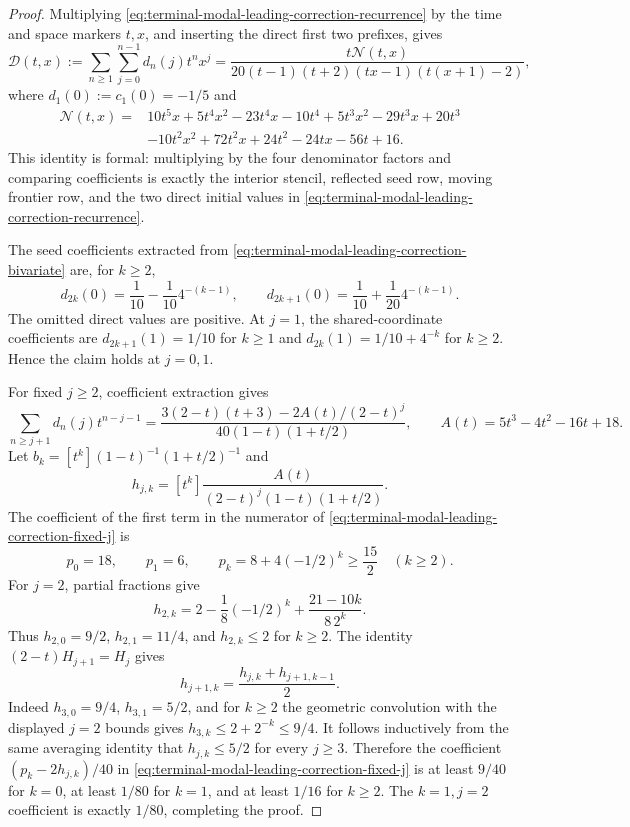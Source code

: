\begin{proof}
Multiplying \eqref{eq:terminal-modal-leading-correction-recurrence} by the
time and space markers $t,x$, and inserting the direct first two prefixes,
gives
\begin{equation}
 \mathcal D(t,x):=\sum_{n\ge1}\sum_{j=0}^{n-1}d_n(j)t^nx^j
 =\frac{t\mathcal N(t,x)}
 {20(t-1)(t+2)(tx-1)(t(x+1)-2)},
 \label{eq:terminal-modal-leading-correction-bivariate}
\end{equation}
where $d_1(0):=c_1(0)=-1/5$ and
\begin{align*}
 \mathcal N(t,x)={}&10t^5x+5t^4x^2-23t^4x-10t^4
 +5t^3x^2-29t^3x+20t^3\\
 &-10t^2x^2+72t^2x+24t^2-24tx-56t+16.
\end{align*}
This identity is formal: multiplying by the four denominator factors and
comparing coefficients is exactly the interior stencil, reflected seed row,
moving frontier row, and the two direct initial values in
\eqref{eq:terminal-modal-leading-correction-recurrence}.

The seed coefficients extracted from
\eqref{eq:terminal-modal-leading-correction-bivariate} are, for $k\ge2$,
\[
 d_{2k}(0)=\frac1{10}-\frac1{10}4^{-(k-1)},\qquad
 d_{2k+1}(0)=\frac1{10}+\frac1{20}4^{-(k-1)}.
\]
The omitted direct values are positive.  At $j=1$, the shared-coordinate
coefficients are $d_{2k+1}(1)=1/10$ for $k\ge1$ and
$d_{2k}(1)=1/10+4^{-k}$ for $k\ge2$.  Hence the claim holds at $j=0,1$.

For fixed $j\ge2$, coefficient extraction gives
\begin{equation}
 \sum_{n\ge j+1}d_n(j)t^{n-j-1}
 =\frac{3(2-t)(t+3)-2A(t)/(2-t)^j}
 {40(1-t)(1+t/2)},
 \qquad
 A(t)=5t^3-4t^2-16t+18.
 \label{eq:terminal-modal-leading-correction-fixed-j}
\end{equation}
Let $b_k=[t^k]{(1-t)^{-1}(1+t/2)^{-1}}$ and
\[
 h_{j,k}=[t^k]\frac{A(t)}{(2-t)^j(1-t)(1+t/2)}.
\]
The coefficient of the first term in the numerator of
\eqref{eq:terminal-modal-leading-correction-fixed-j} is
\[
 p_0=18,\qquad p_1=6,\qquad
 p_k=8+4(-1/2)^k\ge\frac{15}{2}\quad(k\ge2).
\]
For $j=2$, partial fractions give
\[
 h_{2,k}=2-\frac18(-1/2)^k+\frac{21-10k}{8\,2^k}.
\]
Thus $h_{2,0}=9/2$, $h_{2,1}=11/4$, and $h_{2,k}\le2$ for $k\ge2$.
The identity $(2-t)H_{j+1}=H_j$ gives
\[
 h_{j+1,k}=\frac{h_{j,k}+h_{j+1,k-1}}2.
\]
Indeed $h_{3,0}=9/4$, $h_{3,1}=5/2$, and for $k\ge2$ the geometric
convolution with the displayed $j=2$ bounds gives
$h_{3,k}\le2+2^{-k}\le9/4$.  It follows inductively from the same averaging
identity that $h_{j,k}\le5/2$ for every $j\ge3$.  Therefore the coefficient
$(p_k-2h_{j,k})/40$ in
\eqref{eq:terminal-modal-leading-correction-fixed-j} is at least $9/40$ for
$k=0$, at least $1/80$ for $k=1$, and at least $1/16$ for $k\ge2$.
The $k=1,j=2$ coefficient is exactly $1/80$, completing the proof.
\end{proof}

